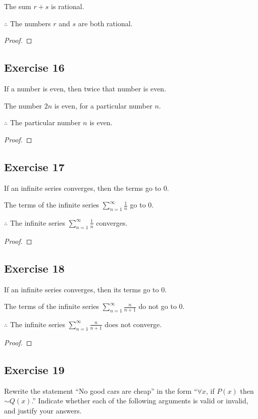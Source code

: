 \documentclass[14pt]{extarticle}
\newcommand{\dps}{\displaystyle}
\newcommand{\fa}{\forall}
\begin{document}
The sum $r + s$ is rational.

$\therefore$ The numbers $r$ and $s$ are both rational.

\begin{proof}

\end{proof}

\subsection{Exercise 16}
If a number is even, then twice that number is even.

The number $2n$ is even, for a particular number $n$.

$\therefore$ The particular number $n$ is even.

\begin{proof}

\end{proof}

\subsection{Exercise 17}
If an infinite series converges, then the terms go to 0.

The terms of the infinite series $\dps \sum_{n = 1}^{\infty} \frac{1}{n}$ go to 0.

$\therefore$ The infinite series $\dps \sum_{n = 1}^{\infty} \frac{1}{n}$ converges.

\begin{proof}

\end{proof}

\subsection{Exercise 18}
If an infinite series converges, then its terms go to 0.

The terms of the infinite series $\dps \sum_{n = 1}^{\infty} \frac{n}{n+1}$ do not go to 0.

$\therefore$ The infinite series $\dps \sum_{n = 1}^{\infty} \frac{n}{n+1}$ does not converge.

\begin{proof}

\end{proof}

\subsection{Exercise 19}
Rewrite the statement “No good cars are cheap” in the form “$\fa x$, if $P(x)$ then $\sim Q(x)$.” Indicate whether each of the following arguments is valid or invalid, and justify your answers.
\end{document}
